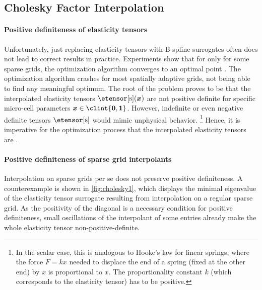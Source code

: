 \breakpagebeforenextheadingtrue
\subsection{Cholesky Factor Interpolation}
\label{sec:623cholesky}

\paragraph{Positive definiteness of elasticity tensors}

Unfortunately, just replacing elasticity tensors with
B-spline surrogates often does not lead to correct results in practice.
Experiments show that for only for some sparse grids,
the optimization algorithm converges to an optimal point
\cite{Valentin16Hierarchical}.
The optimization algorithm crashes for most spatially adaptive grids,
not being able to find any meaningful optimum.
%
The root of the problem proves to be that
the interpolated elasticity tensors $\etensorintp(\*x)$ are not
positive definite for specific
micro-cell parameters $\*x \in \clint{\*0, \*1}$.
However, indefinite or even negative definite tensors $\etensorintp$
would mimic unphysical behavior.%
\footnote{%
  In the scalar case, this is analogous to Hooke's law for linear springs,
  where the force $F = kx$ needed to displace the end of a spring
  (fixed at the other end) by $x$ is proportional to $x$.
  The proportionality constant $k$ (which corresponds to the elasticity tensor)
  has to be positive.%
}
Hence, it is imperative for the optimization process that
the interpolated elasticity tensors are \spd.

\paragraph{Positive definiteness of sparse grid interpolants}

Interpolation on sparse grids per se does not preserve
positive definiteness.
A counterexample is shown in \cref{fig:cholesky1},
which displays the minimal eigenvalue of the elasticity tensor surrogate
resulting from interpolation on a regular sparse grid.
As the positivity of the diagonal is a necessary condition
for positive definiteness,
small oscillations of the interpolant of some entries
already make the whole elasticity tensor non-positive-definite.

